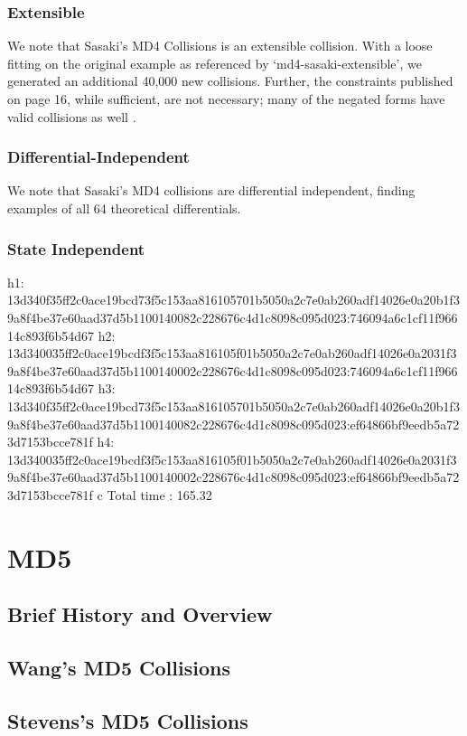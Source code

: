\documentclass[letterpaper,twocolumn,10pt]{article}
\begin{document}
\subsubsection{Extensible}
We note that Sasaki's MD4 Collisions is an extensible collision. With a loose
fitting on the original example as referenced by `md4-sasaki-extensible',
we generated an additional 40,000 new collisions. Further, the constraints
published on page 16, while sufficient, are not necessary; many of the negated
forms have valid collisions as well \cite{Sasaki2007}.


\subsubsection{Differential-Independent}
We note that Sasaki's MD4 collisions are differential independent, finding
examples of all 64 theoretical differentials.

\subsubsection{State Independent}
h1: 13d340f35ff2c0ace19bcd73f5c153aa816105701b5050a2c7e0ab260adf14026e0a20b1f39a8f4be37e60aad37d5b1100140082c228676c4d1c8098c095d023:746094a6c1cf11f96614c893f6b54d67
h2: 13d340035ff2c0ace19bcdf3f5c153aa816105f01b5050a2c7e0ab260adf14026e0a2031f39a8f4be37e60aad37d5b1100140002c228676c4d1c8098c095d023:746094a6c1cf11f96614c893f6b54d67
h3: 13d340f35ff2c0ace19bcd73f5c153aa816105701b5050a2c7e0ab260adf14026e0a20b1f39a8f4be37e60aad37d5b1100140082c228676c4d1c8098c095d023:ef64866bf9eedb5a723d7153bcce781f
h4: 13d340035ff2c0ace19bcdf3f5c153aa816105f01b5050a2c7e0ab260adf14026e0a2031f39a8f4be37e60aad37d5b1100140002c228676c4d1c8098c095d023:ef64866bf9eedb5a723d7153bcce781f
c Total time               : 165.32



\section{MD5}
\subsection{Brief History and Overview}
\subsection{Wang's MD5 Collisions}
\subsection{Stevens's MD5 Collisions}
\end{document}
